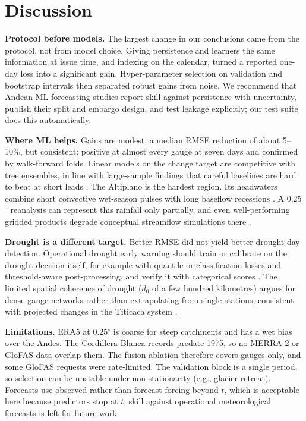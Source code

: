 \section{Discussion}
\label{sec:discussion}

\textbf{Protocol before models.} The largest change in our conclusions came from the protocol, not from model choice. Giving persistence and learners the same information at issue time, and indexing on the calendar, turned a reported one-day loss into a significant gain. Hyper-parameter selection on validation and bootstrap intervals then separated robust gains from noise. We recommend that Andean ML forecasting studies report skill against persistence with uncertainty, publish their split and embargo design, and test leakage explicitly; our test suite does this automatically.

\textbf{Where ML helps.} Gains are modest, a median RMSE reduction of about 5--10\%, but consistent: positive at almost every gauge at seven days and confirmed by walk-forward folds. Linear models on the change target are competitive with tree ensembles, in line with large-sample findings that careful baselines are hard to beat at short leads \cite{pappenberger2015benchmarks,nearing2021role}. The Altiplano is the hardest region. Its headwaters combine short convective wet-season pulses with long baseflow recessions \cite{garreaud2003altiplano}. A 0.25$^\circ$ reanalysis can represent this rainfall only partially, and even well-performing gridded products degrade conceptual streamflow simulations there \cite{lujano2025gridded}.

\textbf{Drought is a different target.} Better RMSE did not yield better drought-day detection. Operational drought early warning should train or calibrate on the drought decision itself, for example with quantile or classification losses and threshold-aware post-processing, and verify it with categorical scores \cite{sutanto2021definitions,hao2018prediction}. The limited spatial coherence of drought ($d_0$ of a few hundred kilometres) argues for dense gauge networks rather than extrapolating from single stations, consistent with projected changes in the Titicaca system \cite{zubieta2021titicaca}.

\textbf{Limitations.} ERA5 at 0.25$^\circ$ is coarse for steep catchments and has a wet bias over the Andes. The Cordillera Blanca records predate 1975, so no MERRA-2 or GloFAS data overlap them. The fusion ablation therefore covers \nFusion{} gauges only, and some GloFAS requests were rate-limited. The validation block is a single period, so selection can be unstable under non-stationarity (e.g., glacier retreat). Forecasts use observed rather than forecast forcing beyond $t$, which is acceptable here because predictors stop at $t$; skill against operational meteorological forecasts is left for future work.

